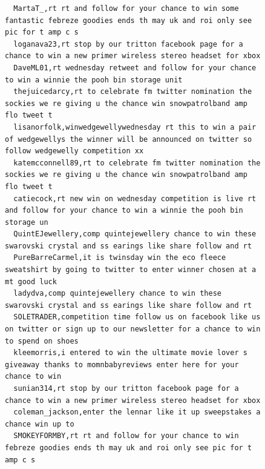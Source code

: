 \begin{figure}[htpb]
\begin{verbatim}
  MartaT_,rt rt and follow for your chance to win some fantastic febreze goodies ends th may uk and roi only see pic for t amp c s
  loganava23,rt stop by our tritton facebook page for a chance to win a new primer wireless stereo headset for xbox
  DaveML01,rt wednesday retweet and follow for your chance to win a winnie the pooh bin storage unit
  thejuicedarcy,rt to celebrate fm twitter nomination the sockies we re giving u the chance win snowpatrolband amp flo tweet t
  lisanorfolk,winwedgewellywednesday rt this to win a pair of wedgewellys the winner will be announced on twitter so follow wedgewelly competition xx
  katemcconnell89,rt to celebrate fm twitter nomination the sockies we re giving u the chance win snowpatrolband amp flo tweet t
  catiecock,rt new win on wednesday competition is live rt and follow for your chance to win a winnie the pooh bin storage un
  QuintEJewellery,comp quintejewellery chance to win these swarovski crystal and ss earings like share follow and rt
  PureBarreCarmel,it is twinsday win the eco fleece sweatshirt by going to twitter to enter winner chosen at a mt good luck
  ladydva,comp quintejewellery chance to win these swarovski crystal and ss earings like share follow and rt
  SOLETRADER,competition time follow us on facebook like us on twitter or sign up to our newsletter for a chance to win to spend on shoes
  kleemorris,i entered to win the ultimate movie lover s giveaway thanks to momnbabyreviews enter here for your chance to win
  sunian314,rt stop by our tritton facebook page for a chance to win a new primer wireless stereo headset for xbox
  coleman_jackson,enter the lennar like it up sweepstakes a chance win up to
  SMOKEYFORMBY,rt rt and follow for your chance to win febreze goodies ends th may uk and roi only see pic for t amp c s


\end{verbatim}
\end{figure}
